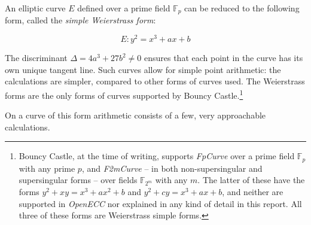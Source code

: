 An elliptic curve \(E\) defined over a prime field \(\mathbb{F}_p\) can be reduced to the following form,
called the \emph{simple Weierstrass form}:

\begin{equation}
	E: y^2 = x^3 + ax + b
\end{equation}

The discriminant \(\Delta = 4a^3 + 27b^2 \neq 0\) ensures that each point in the curve has its own
unique tangent line. Such curves allow for simple point arithmetic: the
calculations are simpler, compared to other forms of curves used. The Weierstrass forms are
the only forms of curves supported by Bouncy Castle.\footnote{Bouncy Castle, at the time of writing,
supports \emph{FpCurve} over a prime field \(\mathbb{F}_p\) with any prime \(p\), and \emph{F2mCurve}
-- in both non-supersingular and supersingular forms -- over fields \(\mathbb{F}_{2 ^ m}\) with any \(m\).
The latter of these have the forms \(y^2 + xy = x^3 + ax^2 + b\) and
\(y^2 + cy = x^3 + ax + b\), and neither are supported in \emph{OpenECC} nor explained in any kind
of detail in this report. All three of these forms are Weierstrass simple forms.\cite{bouncycastle}}

On a curve of this form arithmetic consists of a few, very approachable calculations.